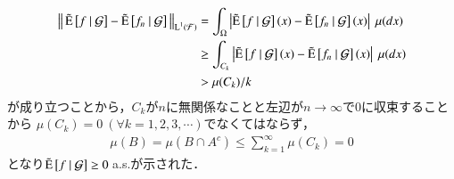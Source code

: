 \begin{prf}
\begin{description}
				\begin{align}
					\left\|\, \tilde{\operatorname{E}} \left[ f \ \middle|\ \mathcal{G} \right] - \tilde{\operatorname{E}} \left[ f_n \ \middle|\ \mathcal{G} \right]\, \right\|_{\operatorname{L}^{1} \left(\mathcal{F}\right)}
					&= \int_\Omega \left| \tilde{\operatorname{E}} \left[ f \ \middle|\ \mathcal{G} \right](x) - \tilde{\operatorname{E}} \left[ f_n \ \middle|\ \mathcal{G} \right](x) \right|\ \mu(dx) \\
					&\geq \int_{C_k} \left| \tilde{\operatorname{E}} \left[ f \ \middle|\ \mathcal{G} \right](x) - \tilde{\operatorname{E}} \left[ f_n \ \middle|\ \mathcal{G} \right](x) \right|\ \mu(dx) \\
					&> \mu(C_k)/k
				\end{align}
				が成り立つことから，$C_k$が$n$に無関係なことと左辺が$n \longrightarrow \infty$で0に収束することから
				$\mu(C_k) = 0 \ (\forall k = 1,2,3,\cdots)$でなくてはならず，
				\begin{align}
					\mu(B) = \mu(B \cap A^c) \leq \sum_{k=1}^{\infty} \mu(C_k) = 0
				\end{align}
				となり$\tcexp{f}{\mathcal{G}} \geq 0\ $a.s.が示された．
				

\end{description}
\end{prf}
